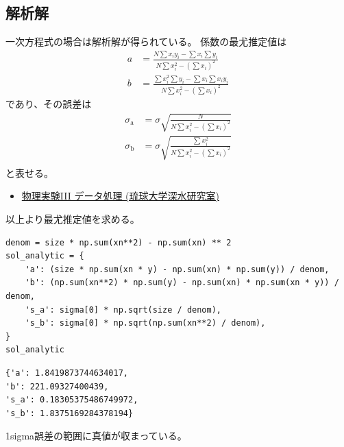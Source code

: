 \documentclass[a4paper, 8pt, notitlepage, uplatex, dvipdfmx]{jsarticle}
\begin{document}
\subsection{解析解}
\label{sec:org90e6171}
一次方程式の場合は解析解が得られている。
係数の最尤推定値は
\begin{align}
\label{eq:1}
  a &= \frac{N\sum x_i y_i - \sum x_i \sum y_i}{N\sum x_i^2 - (\sum x_i)^2} \\
  b &= \frac{\sum x_i^2 \sum y_i - \sum x_i \sum x_i y_i}{N\sum x_i^2 - (\sum x_i)^2}
\end{align}
であり、その誤差は
\begin{align}
\label{eq:2}
  \sigma_\text{a} & = \sigma \sqrt{\frac{N}{N\sum x_i^2 - (\sum x_i)^2}} \\
  \sigma_\text{b} & = \sigma \sqrt{\frac{\sum x_i^2}{N\sum x_i^2 - (\sum x_i)^2}} \\
\end{align}
と表せる。
\begin{itemize}
\item \href{http://www.cc.u-ryukyu.ac.jp/\~fukami/p0.pdf}{物理実験III データ処理 (琉球大学深水研究室)}
\end{itemize}

以上より最尤推定値を求める。
\begin{verbatim}
denom = size * np.sum(xn**2) - np.sum(xn) ** 2
sol_analytic = {
    'a': (size * np.sum(xn * y) - np.sum(xn) * np.sum(y)) / denom,
    'b': (np.sum(xn**2) * np.sum(y) - np.sum(xn) * np.sum(xn * y)) / denom,
    's_a': sigma[0] * np.sqrt(size / denom),
    's_b': sigma[0] * np.sqrt(np.sum(xn**2) / denom),
}
sol_analytic
\end{verbatim}

\label{}
\begin{verbatim}
{'a': 1.8419873744634017,
'b': 221.09327400439,
's_a': 0.18305375486749972,
's_b': 1.8375169284378194}
\end{verbatim}

1sigma誤差の範囲に真値が収まっている。
\end{document}
